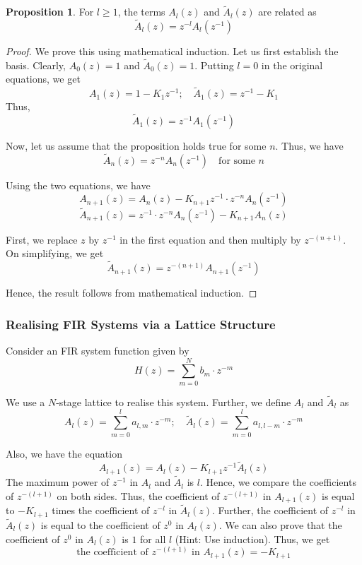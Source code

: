 \documentclass{article}
\theoremstyle{definition}
\newtheorem{prop}[theorem]{Proposition}
\begin{document}
\begin{prop}
For $l \geq 1$, the terms $A_l(z)$ and $\widetilde{A}_{l}(z)$ are related as
\[  
    \widetilde{A}_{l}(z) = z^{-l} A_l(z^{-1}) 
\]  
\end{prop}
\begin{proof}
We prove this using mathematical induction. Let us first establish the basis. Clearly, $A_0(z) = 1$ and $\widetilde{A}_{0}(z) = 1$. Putting $l=0$ in the original equations, we get 
\[
    A_1(z) = 1 - K_1 z^{-1} ; \quad \widetilde{A}_{1}(z) = z^{-1} - K_1
\]
Thus, 
\[
    \widetilde{A}_{1}(z) = z^{-1} A_1(z^{-1}) 
\]

Now, let us assume that the proposition holds true for some $n$. Thus, we have 
\[
    \widetilde{A}_{n}(z) = z^{-n} A_n(z^{-1}) \quad \text{for some } n 
\]

Using the two equations, we have 
\[
    A_{n+1}(z) = A_n(z) - K_{n+1} z^{-1} \cdot z^{-n} A_n(z^{-1})
\]
\[
    \widetilde{A}_{n+1}(z) = z^{-1} \cdot z^{-n} A_n(z^{-1}) - K_{n+1} A_n(z)
\]

First, we replace $z$ by $z^{-1}$ in the first equation and then multiply by $z^{-(n+1)}$. On simplifying, we get 
\[
    \widetilde{A}_{n+1}(z) = z^{-(n+1)} A_{n+1}(z^{-1})
\]

Hence, the result follows from mathematical induction.
\end{proof}

\subsubsection{Realising FIR Systems via a Lattice Structure}

Consider an FIR system function given by 
\[
    H(z) = \sum_{m=0}^{N} b_m \cdot z^{-m}
\]

We use a $N$-stage lattice to realise this system. Further, we define $A_l$ and $\widetilde{A}_{l}$ as 
\[
    A_l(z) = \sum_{m=0}^{l} a_{l,m} \cdot z^{-m};\quad \widetilde{A}_{l}(z) = \sum_{m=0}^{l} a_{l,l-m} \cdot z^{-m}
\]

Also, we have the equation 
\[
    A_{l+1}(z) = A_l(z) - K_{l+1} z^{-1} \widetilde{A}_{l}(z)
\]
The maximum power of $z^{-1}$ in $A_l$ and $\widetilde{A}_{l}$ is $l$. Hence, we compare the coefficients of $z^{-(l+1)}$ on both sides. Thus, the coefficient of $z^{-(l+1)}$ in $A_{l+1}(z)$ is equal to $-K_{l+1}$ times the coefficient of $z^{-l}$ in $\widetilde{A}_{l}(z)$. Further, the coefficient of $z^{-l}$ in $\widetilde{A}_{l}(z)$ is equal to the coefficient of $z^0$ in $A_l(z)$. We can also prove that the coefficient of $z^0$ in $A_l(z)$ is $1$ for all $l$ (Hint: Use induction). Thus, we get 
\[
    \text{the coefficient of } z^{-(l+1)} \text{ in } A_{l+1}(z) = -K_{l+1}
\]
\end{document}
